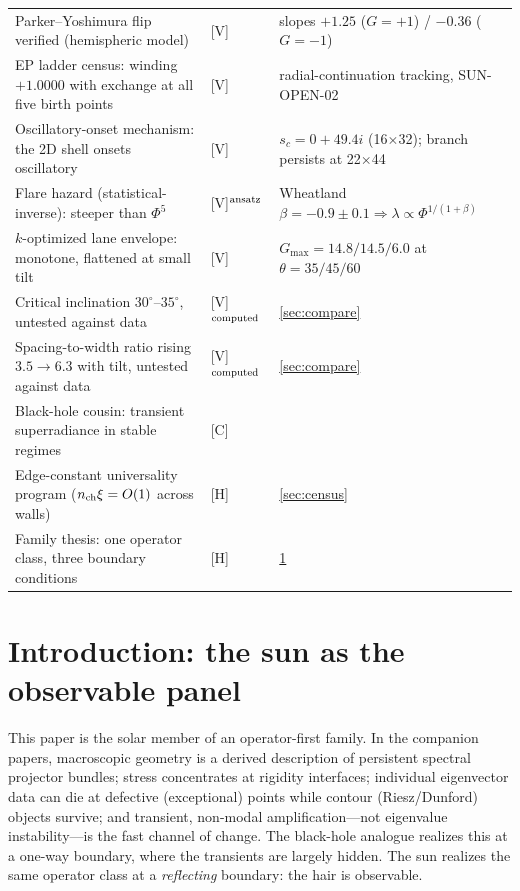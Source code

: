 \documentclass[11pt]{article}
\renewcommand{\S}{\mathhexbox278}
\theoremstyle{definition}
\theoremstyle{remark}
\begin{document}
\begin{center}
\begin{tabular}{p{8.4cm} l p{4.1cm}}
Parker--Yoshimura flip verified (hemispheric model) & [V] & slopes $+1.25$ ($G{=}{+}1$) / $-0.36$ ($G{=}{-}1$) \\
EP ladder census: winding $+1.0000$ with exchange at all five birth points & [V] & radial-continuation tracking, SUN-OPEN-02 \\
Oscillatory-onset mechanism: the 2D shell onsets oscillatory & [V] & $s_c = 0+49.4i$ (16$\times$32); branch persists at 22$\times$44 \\
Flare hazard (statistical-inverse): steeper than $\Phi^{5}$ & [V]$^{\rm ansatz}$ & Wheatland $\beta=-0.9{\pm}0.1 \Rightarrow \lambda\propto\Phi^{1/(1+\beta)}$ \\
$k$-optimized lane envelope: monotone, flattened at small tilt & [V] & $G_{\max} = 14.8/14.5/6.0$ at $\theta=35/45/60$ \\
Critical inclination $30^\circ$--$35^\circ$, untested against data & [V]$^{\rm computed}$ & \S\ref{sec:compare} \\
Spacing-to-width ratio rising $3.5\to6.3$ with tilt, untested against data & [V]$^{\rm computed}$ & \S\ref{sec:compare} \\
Black-hole cousin: transient superradiance in stable regimes & [C] & \cite{carballo,besson} \\
Edge-constant universality program ($n_{\rm ch}\xi = O(1)$ across walls) & [H] & \S\ref{sec:census} \\
Family thesis: one operator class, three boundary conditions & [H] & \S\ref{sec:intro} \\
\hline
\end{tabular}
\end{center}

\section{Introduction: the sun as the observable panel}\label{sec:intro}
This paper is the solar member of an operator-first family. In the companion
papers, macroscopic geometry is a derived description of persistent spectral
projector bundles; stress concentrates at rigidity interfaces; individual
eigenvector data can die at defective (exceptional) points while contour
(Riesz/Dunford) objects survive; and transient, non-modal amplification---not
eigenvalue instability---is the fast channel of change. The black-hole
analogue realizes this at a one-way boundary, where the transients are
largely hidden. The sun realizes the same operator class at a
\emph{reflecting} boundary: the hair is observable.
\end{document}
